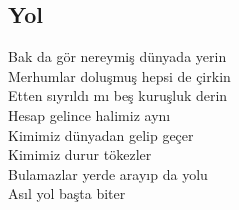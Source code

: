 \subsection{Yol}

Bak da gör nereymiş dünyada yerin \\
Merhumlar doluşmuş hepsi de çirkin \\
Etten sıyrıldı mı beş kuruşluk derin \\
Hesap gelince halimiz aynı \\

\noindent\newline
Kimimiz dünyadan gelip geçer \\
Kimimiz durur tökezler \\
Bulamazlar yerde arayıp da yolu \\
Asıl yol başta biter \\
